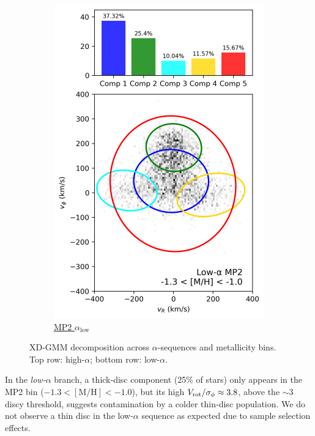 \documentclass[a4paper,10pt]{article}
\begin{document}
\begin{multicols}{2}
\begin{figure}[H]
\begin{subfigure}[t]{0.24\linewidth}
    \includegraphics[width=\linewidth]{../figures/gmm_mp2_low_alpha_k6.png}
    \caption{\href{https://raw.githack.com/raunaq-rai/Disentangling-the-Milky-Way-using-GMM/main/figures/MP2\_low\_\_\_\_-1.3\%5BM\_H\%5D-1.0.html}{MP2 $\alpha_{\mathrm{low}}$}}
    \label{fig:low_mp2}
  \end{subfigure}


  \caption{XD-GMM decomposition across $\alpha$-sequences and metallicity bins. Top row: high-$\alpha$; bottom row: low-$\alpha$.}
  \label{fig:gmm_alpha_bins}
\end{figure}

In the \textit{low-$\alpha$} branch, a thick‐disc component (25\% of stars) only appears in the MP2 
bin ($-1.3<\mathrm{[M/H]}<-1.0$), but its high $V_{\rm rot}/\sigma_{\phi}\approx3.8$, above 
the $\sim3$ discy threshold, suggests contamination by a colder thin‐disc population. We do not observe
a thin disc in the low-$\alpha$ sequence as expected due to sample selection effects.


\end{multicols}
\end{document}
